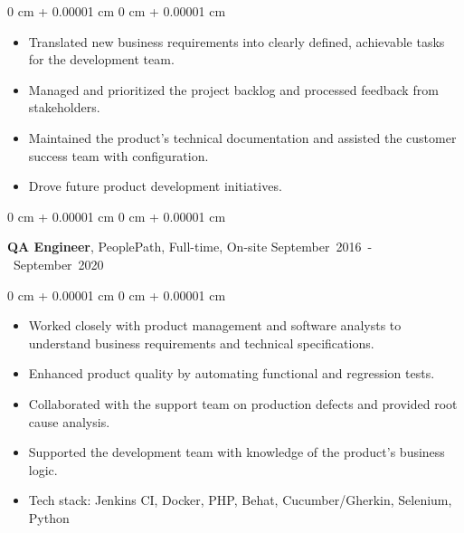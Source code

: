 \documentclass[10pt, a4paper]{article}
\newenvironment{highlights}{
    \begin{itemize}[
        topsep=0.10 cm,
        parsep=0.10 cm,
        partopsep=0pt,
        itemsep=0pt,
        leftmargin=0 cm + 10pt
    ]
}{
    \end{itemize}
} %
\newenvironment{onecolentry}{
    \begin{adjustwidth}{
        0 cm + 0.00001 cm
    }{
        0 cm + 0.00001 cm
    }
}{
    \end{adjustwidth}
} %
\newenvironment{twocolentry}[2][]{
    \onecolentry
    \def\secondColumn{#2}
    \setcolumnwidth{\fill, 4.5 cm}
    \begin{paracol}{2}
}{
    \switchcolumn \raggedleft \secondColumn
    \end{paracol}
    \endonecolentry
} %
\begin{document}
        \vspace{0.10 cm}
        \begin{onecolentry}
            \begin{highlights}
                \item Translated new business requirements into clearly defined, achievable tasks for the development team.
                \item Managed and prioritized the project backlog and processed feedback from stakeholders.
                \item Maintained the product's technical documentation and assisted the customer success team with configuration.
                \item Drove future product development initiatives.
            \end{highlights}
        \end{onecolentry}

        \vspace{0.5 cm}

        \begin{twocolentry}{
            \small\mbox{September 2016 - September 2020}
        }
            \textbf{QA Engineer}, PeoplePath, Full-time, On-site\end{twocolentry}

        \vspace{0.10 cm}
        \begin{onecolentry}
            \begin{highlights}
                \item Worked closely with product management and software analysts to understand business requirements and technical specifications.
                \item Enhanced product quality by automating functional and regression tests.
                \item Collaborated with the support team on production defects and provided root cause analysis.
                \item Supported the development team with knowledge of the product's business logic.
                \item Tech stack: Jenkins CI, Docker, PHP, Behat, Cucumber/Gherkin, Selenium, Python
            \end{highlights}
        \end{onecolentry}

    \vspace{0.2 cm}
\end{document}
